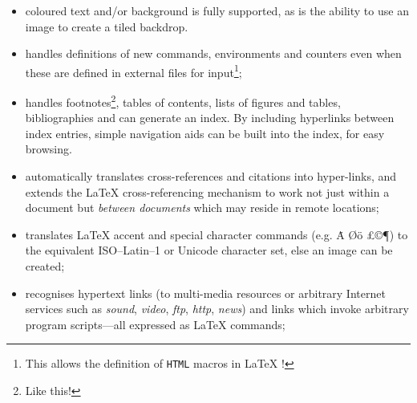 \begin{itemize}
%
%
%
\item 
coloured text and/or background is fully supported, as is the
ability to use an image to create a tiled backdrop.

%
%
%
\item 
handles definitions of new commands, environments and counters
even when these are defined in external files for input\footnote{%
This allows the definition of \texttt{HTML} macros in \LaTeX{} !};

%
%
\item 
handles footnotes\footnote{Like this!}, 
tables of contents, lists of figures and tables, 
bibliographies and can generate an index.
By including hyperlinks between index entries, 
simple navigation aids can be built into the index, for easy browsing.

%
%
\item 
automatically translates cross-references and citations into hyper-links,
and extends the \LaTeX{}  cross-referencing mechanism to work
not just within a document but \emph{between documents} 
which may reside in remote locations;

%
%
%
%
\item 
translates \LaTeX{}  accent and special character 
commands (e.g. \. {A} \O {\"o} \pounds \copyright \P) to
the equivalent ISO--Latin--1 or Unicode character set,
else an image can be created;

%
%
%
\item 
recognises hypertext links (to multi-media resources or
arbitrary Internet services such as 
\textsl{sound}, \textsl{video}, \textsl{ftp}, \textsl{http}, \textsl{news}) and
links which invoke arbitrary program scripts---all expressed as \LaTeX{}  
commands;


\end{itemize}

